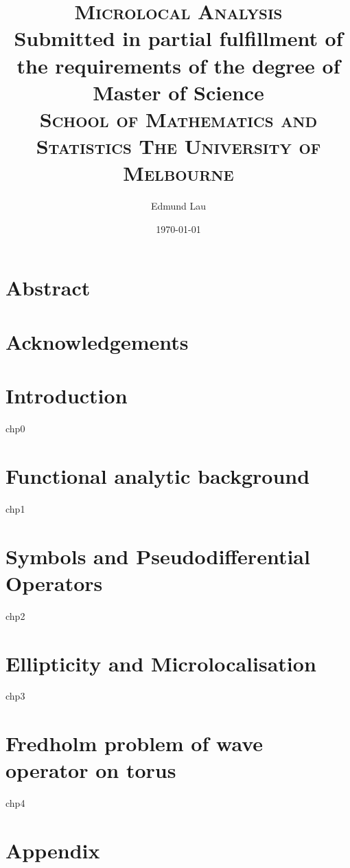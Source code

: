 \documentclass[12pt, twoside]{report}
\title{    
    \textsc{Microlocal Analysis} \\
    Submitted in partial fulfillment of the requirements of the degree of Master of Science \\
    \textsc{School of Mathematics and Statistics The University of Melbourne} 
}
\author{Edmund Lau}
\date{\today}
\begin{document}
\maketitle




\chapter*{Abstract}


\chapter*{Acknowledgements}

\tableofcontents
\chapter{Introduction}
{chp0}


\chapter{Functional analytic background}
{chp1}

\chapter{Symbols and Pseudodifferential Operators}
{chp2}

\chapter{Ellipticity and Microlocalisation}
{chp3}

\chapter{Fredholm problem of wave operator on torus}
{chp4}

\appendix
\chapter{Appendix}

%
\end{document}

